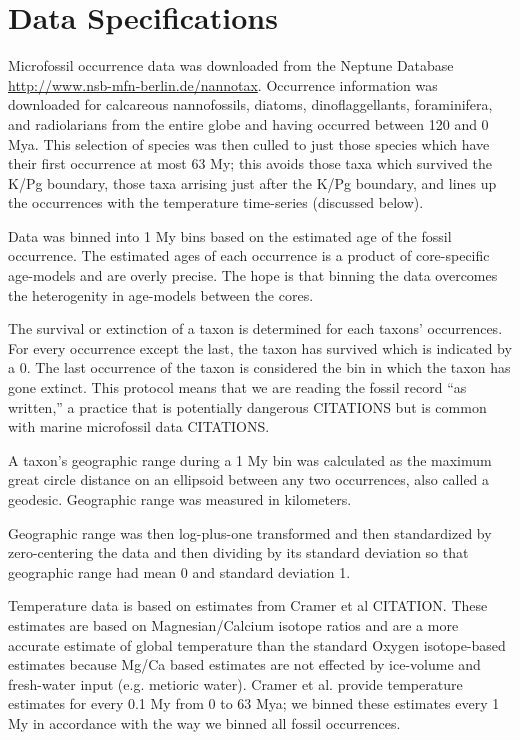 \documentclass[12pt,letterpaper]{article}
\begin{document}
\section{Data Specifications}

Microfossil occurrence data was downloaded from the Neptune Database \url{http://www.nsb-mfn-berlin.de/nannotax}. Occurrence information was downloaded for calcareous nannofossils, diatoms, dinoflaggellants, foraminifera, and radiolarians from the entire globe and having occurred between 120 and 0 Mya. This selection of species was then culled to just those species which have their first occurrence at most 63 My; this avoids those taxa which survived the K/Pg boundary, those taxa arrising just after the K/Pg boundary, and lines up the occurrences with the temperature time-series (discussed below).

Data was binned into 1 My bins based on the estimated age of the fossil occurrence. The estimated ages of each occurrence is a product of core-specific age-models and are overly precise. The hope is that binning the data overcomes the heterogenity in age-models between the cores. 


The survival or extinction of a taxon is determined for each taxons' occurrences. For every occurrence except the last, the taxon has survived which is indicated by a 0. The last occurrence of the taxon is considered the bin in which the taxon has gone extinct. This protocol means that we are reading the fossil record ``as written,'' a practice that is potentially dangerous CITATIONS but is common with marine microfossil data CITATIONS.

A taxon's geographic range during a 1 My bin was calculated as the maximum great circle distance on an ellipsoid between any two occurrences, also called a geodesic. Geographic range was measured in kilometers.

Geographic range was then log-plus-one transformed and then standardized by zero-centering the data and then dividing by its standard deviation so that geographic range had mean 0 and standard deviation 1.

Temperature data is based on estimates from Cramer et al CITATION. These estimates are based on Magnesian/Calcium isotope ratios and are a more accurate estimate of global temperature than the standard Oxygen isotope-based estimates because Mg/Ca based estimates are not effected by ice-volume and fresh-water input (e.g. metioric water). Cramer et al. provide temperature estimates for every 0.1 My from 0 to 63 Mya; we binned these estimates every 1 My in accordance with the way we binned all fossil occurrences.
\end{document}

